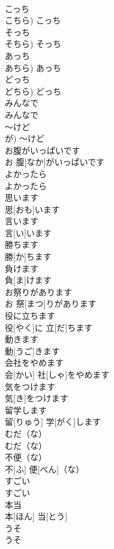\documentclass[8pt]{extreport}
\begin{document}
\begin{CJK}{UTF8}{min}
\\	こっち	
\\	こちら)	こっち		
\\	そっち	
\\	そちら)	そっち		
\\	あっち	
\\	あちら)	あっち		
\\	どっち	
\\	どちら)	どっち		
\\	みんなで	
\\	みんなで		
\\	～けど	
\\	が)	～けど		
\\	お腹がいっぱいです	
\\	お 腹[なか]がいっぱいです		
\\	よかったら	
\\	よかったら		
\\	思います	
\\	思[おも]います		
\\	言います	
\\	言[い]います		
\\	勝ちます	
\\	勝[か]ちます		
\\	負けます	
\\	負[ま]けます		
\\	お祭りがあります	
\\	お 祭[まつ]りがあります		
\\	役に立ちます	
\\	役[やく]に 立[だ]ちます		
\\	動きます	
\\	動[うご]きます		
\\	会社をやめます	
\\	会[かい] 社[しゃ]をやめます		
\\	気をつけます	
\\	気[き]をつけます		
\\	留学します	
\\	留[りゅう] 学[がく]します		
\\	むだ（な）	
\\	むだ（な）		
\\	不便（な）	
\\	不[ふ] 便[べん]（な）		
\\	すごい	
\\	すごい		
\\	本当	
\\	本[ほん] 当[とう]		
\\	うそ	
\\	うそ		

\end{CJK}
\end{document}
